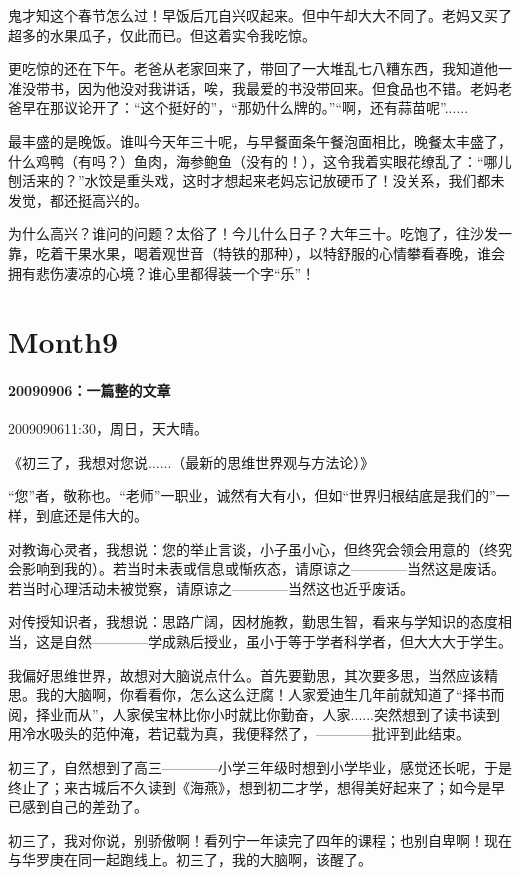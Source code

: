 \documentclass[UTF8]{Diaries}
\begin{document}
鬼才知这个春节怎么过！早饭后兀自兴叹起来。但中午却大大不同了。老妈又买了超多的水果瓜子，仅此而已。但这着实令我吃惊。

更吃惊的还在下午。老爸从老家回来了，带回了一大堆乱七八糟东西，我知道他一准没带书，因为他没对我讲话，唉，我最爱的书没带回来。但食品也不错。老妈老爸早在那议论开了：“这个挺好的”，“那奶什么牌的。”“啊，还有蒜苗呢”......

最丰盛的是晚饭。谁叫今天年三十呢，与早餐面条午餐泡面相比，晚餐太丰盛了，什么鸡鸭（有吗？）鱼肉，海参鲍鱼（没有的！），这令我着实眼花缭乱了：“哪儿刨活来的？”水饺是重头戏，这时才想起来老妈忘记放硬币了！没关系，我们都未发觉，都还挺高兴的。

为什么高兴？谁问的问题？太俗了！今儿什么日子？大年三十。吃饱了，往沙发一靠，吃着干果水果，喝着观世音（特铁的那种），以特舒服的心情攀看春晚，谁会拥有悲伤凄凉的心境？谁心里都得装一个字“乐”！

\section{Month9}


\paragraph{20090906：一篇整的文章}
2009090611:30，周日，天大晴。

《初三了，我想对您说......（最新的思维世界观与方法论）》

“您”者，敬称也。“老师”一职业，诚然有大有小，但如“世界归根结底是我们的”一样，到底还是伟大的。

对教诲心灵者，我想说：您的举止言谈，小子虽小心，但终究会领会用意的（终究会影响到我的）。若当时未表或信息或惭疚态，请原谅之————当然这是废话。若当时心理活动未被觉察，请原谅之————当然这也近乎废话。

对传授知识者，我想说：思路广阔，因材施教，勤思生智，看来与学知识的态度相当，这是自然————学成熟后授业，虽小于等于学者科学者，但大大大于学生。

我偏好思维世界，故想对大脑说点什么。首先要勤思，其次要多思，当然应该精思。我的大脑啊，你看看你，怎么这么迂腐！人家爱迪生几年前就知道了“择书而阅，择业而从”，人家侯宝林比你小时就比你勤奋，人家......突然想到了读书读到用冷水吸头的范仲淹，若记载为真，我便释然了，————批评到此结束。

初三了，自然想到了高三————小学三年级时想到小学毕业，感觉还长呢，于是终止了；来古城后不久读到《海燕》，想到初二才学，想得美好起来了；如今是早已感到自己的差劲了。

初三了，我对你说，别骄傲啊！看列宁一年读完了四年的课程；也别自卑啊！现在与华罗庚在同一起跑线上。初三了，我的大脑啊，该醒了。
\end{document}
